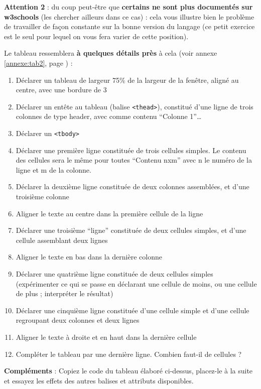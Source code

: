 \documentclass[a4paper,11pt]{article}
\begin{document}
\begin{afaire}
\textcolor{rougetitre}{\textbf{Attention 2}} : du coup peut-être que \textbf{certains ne sont plus documentés sur w3schools} (les chercher ailleurs dans ce cas) : cela vous illustre bien le problème de travailler de façon constante sur la bonne version du langage (ce petit exercice est le seul pour lequel on vous fera varier de cette position).

Le tableau ressemblera \textbf{à quelques détails près} à cela
(voir annexe \ref{annexe:tab2}, page \pageref{annexe:tab2}) :

\begin{enumerate}
    \item Déclarer un tableau de largeur 75\% de la largeur de la fenêtre, aligné au centre, avec une bordure de 3
    \item Déclarer un entête au tableau (balise \texttt{<thead>}), constitué d'une ligne de trois colonnes de type header, avec comme contenu ``Colonne 1''\ldots
    \item Déclarer un \texttt{<tbody>}
    \item Déclarer une première ligne constituée de trois cellules simples. Le contenu des cellules sera le même pour toutes ``Contenu nxm'' avec n le numéro de la ligne et m de la colonne.
    \item Déclarer la deuxième ligne constituée de deux colonnes assemblées, et d'une troisième colonne
    \item Aligner le texte au centre dans la première cellule de la ligne
    \item Déclarer une troisième ``ligne'' constituée de deux cellules simples, et d'une cellule assemblant deux lignes
    \item Aligner le texte en bas dans la dernière colonne
    \item Déclarer une quatrième ligne constituée de deux cellules simples (expérimenter ce qui se passe en déclarant une cellule de moins, ou une cellule de plus ; interpréter le résultat)
    \item Déclarer une cinquième ligne constituée d'une cellule simple et d'une cellule regroupant deux colonnes et deux lignes
    \item Aligner le texte à droite et en haut dans la dernière cellule
    \item Compléter le tableau par une dernière ligne. Combien faut-il de cellules ?
\end{enumerate}

\textcolor{rougetitre}{\textbf{Compléments}} : Copiez le code du tableau élaboré ci-dessus, placez-le à la suite et essayez les effets des autres balises et attributs disponibles.


\end{afaire}
\end{document}
